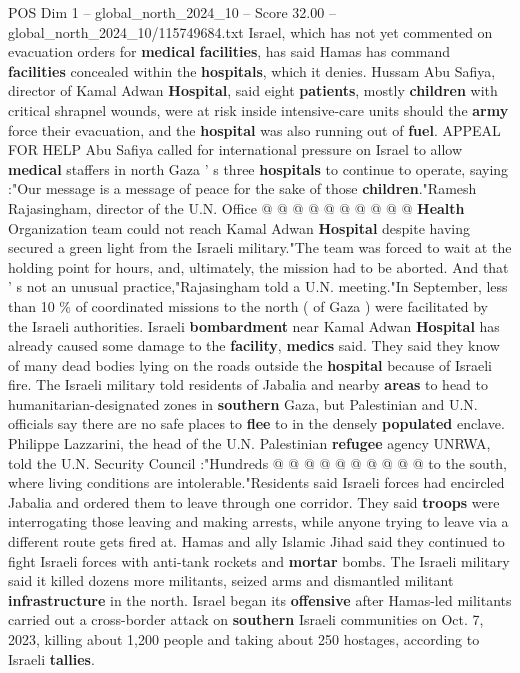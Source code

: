 \begin{textsample}{POS Dim 1 – global\_north\_2024\_10 – Score 32.00 – global\_north\_2024\_10/115749684.txt}
Israel, which has not yet commented on evacuation orders for \textbf{medical} \textbf{facilities}, has said Hamas has command \textbf{facilities} concealed within the \textbf{hospitals}, which it denies.
Hussam Abu Safiya, director of Kamal Adwan \textbf{Hospital}, said eight \textbf{patients}, mostly \textbf{children} with critical shrapnel wounds, were at risk inside intensive-care units should the \textbf{army} force their evacuation, and the \textbf{hospital} was also running out of \textbf{fuel}.
APPEAL FOR HELP Abu Safiya called for international pressure on Israel to allow \textbf{medical} staffers in north Gaza ' s three \textbf{hospitals} to continue to operate, saying :"Our message is a message of peace for the sake of those \textbf{children}."Ramesh Rajasingham, director of the U.N.
Office @ @ @ @ @ @ @ @ @ @ \textbf{Health} Organization team could not reach Kamal Adwan \textbf{Hospital} despite having secured a green light from the Israeli military."The team was forced to wait at the holding point for hours, and, ultimately, the mission had to be aborted.
And that ' s not an unusual practice,"Rajasingham told a U.N. meeting."In September, less than 10 \% of coordinated missions to the north ( of Gaza ) were facilitated by the Israeli authorities.
Israeli \textbf{bombardment} near Kamal Adwan \textbf{Hospital} has already caused some damage to the \textbf{facility}, \textbf{medics} said.
They said they know of many dead bodies lying on the roads outside the \textbf{hospital} because of Israeli fire.
The Israeli military told residents of Jabalia and nearby \textbf{areas} to head to humanitarian-designated zones in \textbf{southern} Gaza, but Palestinian and U.N. officials say there are no safe places to \textbf{flee} to in the densely \textbf{populated} enclave.
Philippe Lazzarini, the head of the U.N.
Palestinian \textbf{refugee} agency UNRWA, told the U.N.
Security Council :"Hundreds @ @ @ @ @ @ @ @ @ @ to the south, where living conditions are intolerable."Residents said Israeli forces had encircled Jabalia and ordered them to leave through one corridor.
They said \textbf{troops} were interrogating those leaving and making arrests, while anyone trying to leave via a different route gets fired at.
Hamas and ally Islamic Jihad said they continued to fight Israeli forces with anti-tank rockets and \textbf{mortar} bombs.
The Israeli military said it killed dozens more militants, seized arms and dismantled militant \textbf{infrastructure} in the north.
Israel began its \textbf{offensive} after Hamas-led militants carried out a cross-border attack on \textbf{southern} Israeli communities on Oct. 7, 2023, killing about 1,200 people and taking about 250 hostages, according to Israeli \textbf{tallies}.

\end{textsample}
